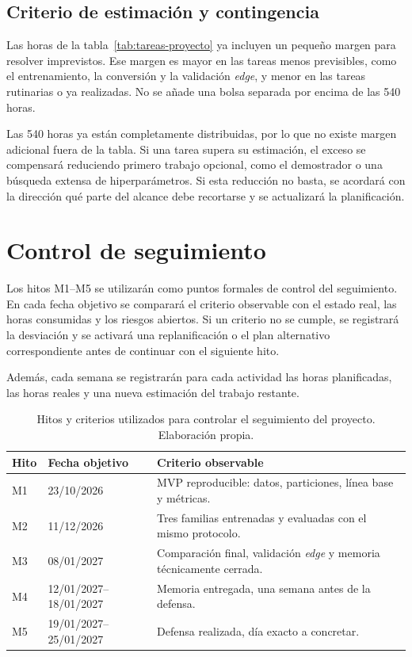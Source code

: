 \subsection{Criterio de estimación y contingencia}

Las horas de la tabla~\ref{tab:tareas-proyecto} ya incluyen un pequeño margen
para resolver imprevistos. Ese margen es mayor en las tareas menos previsibles,
como el entrenamiento, la conversión y la validación \emph{edge}, y menor en las
tareas rutinarias o ya realizadas. No se añade una bolsa separada por encima de
las 540 horas.

Las 540 horas ya están completamente distribuidas, por lo que no existe margen
adicional fuera de la tabla. Si una tarea supera su estimación, el exceso se
compensará reduciendo primero trabajo opcional, como el demostrador o una
búsqueda extensa de hiperparámetros. Si esta reducción no basta, se acordará con
la dirección qué parte del alcance debe recortarse y se actualizará la
planificación.

\section{Control de seguimiento}
\label{sec:control-seguimiento}

Los hitos M1--M5 se utilizarán como puntos formales de control del seguimiento.
En cada fecha objetivo se comparará el criterio observable con el estado real,
las horas consumidas y los riesgos abiertos. Si un criterio no se cumple, se
registrará la desviación y se activará una replanificación o el plan alternativo
correspondiente antes de continuar con el siguiente hito.

Además, cada semana se registrarán para cada actividad las horas planificadas,
las horas reales y una nueva estimación del trabajo restante.

\begin{table}[H]
  \centering
  \small
  \begin{tabularx}{\textwidth}{L{1.2cm}L{2.4cm}Y}
    \toprule
    \textbf{Hito} & \textbf{Fecha objetivo} & \textbf{Criterio observable} \\
    \midrule
    M1 & 23/10/2026 & MVP reproducible: datos, particiones, línea base y métricas. \\
    M2 & 11/12/2026 & Tres familias entrenadas y evaluadas con el mismo protocolo. \\
    M3 & 08/01/2027 & Comparación final, validación \emph{edge} y memoria técnicamente cerrada. \\
    M4 & 12/01/2027--18/01/2027 & Memoria entregada, una semana antes de la defensa. \\
    M5 & 19/01/2027--25/01/2027 & Defensa realizada, día exacto a concretar. \\
    \bottomrule
  \end{tabularx}
  \caption[Hitos de control]{Hitos y criterios utilizados para controlar el
  seguimiento del proyecto. Elaboración propia.}
  \label{tab:planificacion-hitos}
\end{table}

